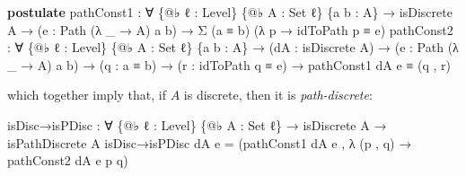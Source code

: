 \documentclass[
  12pt]{article}
\newenvironment{Shaded}{\begin{snugshade}}{\end{snugshade}}
\newcommand{\DataTypeTok}[1]{\textcolor[rgb]{0.00,0.34,0.68}{#1}}
\newcommand{\KeywordTok}[1]{\textcolor[rgb]{0.12,0.11,0.11}{\textbf{#1}}}
\newcommand{\NormalTok}[1]{\textcolor[rgb]{0.12,0.11,0.11}{#1}}
\newcommand{\OtherTok}[1]{\textcolor[rgb]{0.00,0.43,0.16}{#1}}
\begin{document}
\begin{Shaded}
\begin{Highlighting}[]
\KeywordTok{postulate}
\NormalTok{    pathConst1 }\OtherTok{:} \OtherTok{∀} \OtherTok{\{@}\NormalTok{♭ ℓ }\OtherTok{:}\NormalTok{ Level}\OtherTok{\}} \OtherTok{\{@}\NormalTok{♭ A }\OtherTok{:} \DataTypeTok{Set}\NormalTok{ ℓ}\OtherTok{\}} \OtherTok{\{}\NormalTok{a b }\OtherTok{:}\NormalTok{ A}\OtherTok{\}}
                   \OtherTok{→}\NormalTok{ isDiscrete A }\OtherTok{→} \OtherTok{(}\NormalTok{e }\OtherTok{:}\NormalTok{ Path }\OtherTok{(λ} \OtherTok{\_} \OtherTok{→}\NormalTok{ A}\OtherTok{)}\NormalTok{ a b}\OtherTok{)}
                   \OtherTok{→}\NormalTok{ Σ }\OtherTok{(}\NormalTok{a ≡ b}\OtherTok{)} \OtherTok{(λ}\NormalTok{ p }\OtherTok{→}\NormalTok{ idToPath p ≡ e}\OtherTok{)}
\NormalTok{    pathConst2 }\OtherTok{:} \OtherTok{∀} \OtherTok{\{@}\NormalTok{♭ ℓ }\OtherTok{:}\NormalTok{ Level}\OtherTok{\}} \OtherTok{\{@}\NormalTok{♭ A }\OtherTok{:} \DataTypeTok{Set}\NormalTok{ ℓ}\OtherTok{\}} \OtherTok{\{}\NormalTok{a b }\OtherTok{:}\NormalTok{ A}\OtherTok{\}}
                   \OtherTok{→} \OtherTok{(}\NormalTok{dA }\OtherTok{:}\NormalTok{ isDiscrete A}\OtherTok{)} \OtherTok{→} \OtherTok{(}\NormalTok{e }\OtherTok{:}\NormalTok{ Path }\OtherTok{(λ} \OtherTok{\_} \OtherTok{→}\NormalTok{ A}\OtherTok{)}\NormalTok{ a b}\OtherTok{)}
                   \OtherTok{→} \OtherTok{(}\NormalTok{q }\OtherTok{:}\NormalTok{ a ≡ b}\OtherTok{)} \OtherTok{→} \OtherTok{(}\NormalTok{r }\OtherTok{:}\NormalTok{ idToPath q ≡ e}\OtherTok{)}
                   \OtherTok{→}\NormalTok{ pathConst1 dA e ≡ }\OtherTok{(}\NormalTok{q , r}\OtherTok{)}
\end{Highlighting}
\end{Shaded}

which together imply that, if \(A\) is discrete, then it is
\emph{path-discrete}:

\begin{Shaded}
\begin{Highlighting}[]
\NormalTok{isDisc→isPDisc }\OtherTok{:} \OtherTok{∀} \OtherTok{\{@}\NormalTok{♭ ℓ }\OtherTok{:}\NormalTok{ Level}\OtherTok{\}} \OtherTok{\{@}\NormalTok{♭ A }\OtherTok{:} \DataTypeTok{Set}\NormalTok{ ℓ}\OtherTok{\}}
                 \OtherTok{→}\NormalTok{ isDiscrete A }\OtherTok{→}\NormalTok{ isPathDiscrete A}
\NormalTok{isDisc→isPDisc dA e }\OtherTok{=} 
    \OtherTok{(}\NormalTok{pathConst1 dA e , }\OtherTok{λ} \OtherTok{(}\NormalTok{p , q}\OtherTok{)} \OtherTok{→}\NormalTok{ pathConst2 dA e p q}\OtherTok{)}
\end{Highlighting}
\end{Shaded}
\end{document}

